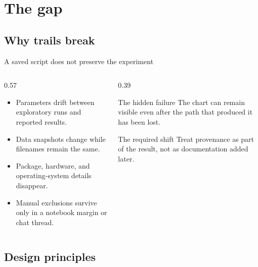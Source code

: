 \section{The gap}
\subsection{Why trails break}

\begin{frame}{A saved script does not preserve the experiment}
  \begin{columns}[T,onlytextwidth]
    \begin{column}{0.57\textwidth}
      \begin{itemize}
        \item Parameters drift between exploratory runs and reported results.
        \item Data snapshots change while filenames remain the same.
        \item Package, hardware, and operating-system details disappear.
        \item Manual exclusions survive only in a notebook margin or chat thread.
      \end{itemize}
    \end{column}
    \begin{column}{0.39\textwidth}
      \begin{alertblock}{The hidden failure}
        The chart can remain visible even after the path that produced it has been
        lost.
      \end{alertblock}
      \vspace{0.15cm}
      \begin{exampleblock}{The required shift}
        Treat provenance as part of the result, not as documentation added later.
      \end{exampleblock}
    \end{column}
  \end{columns}
\end{frame}

\subsection{Design principles}


